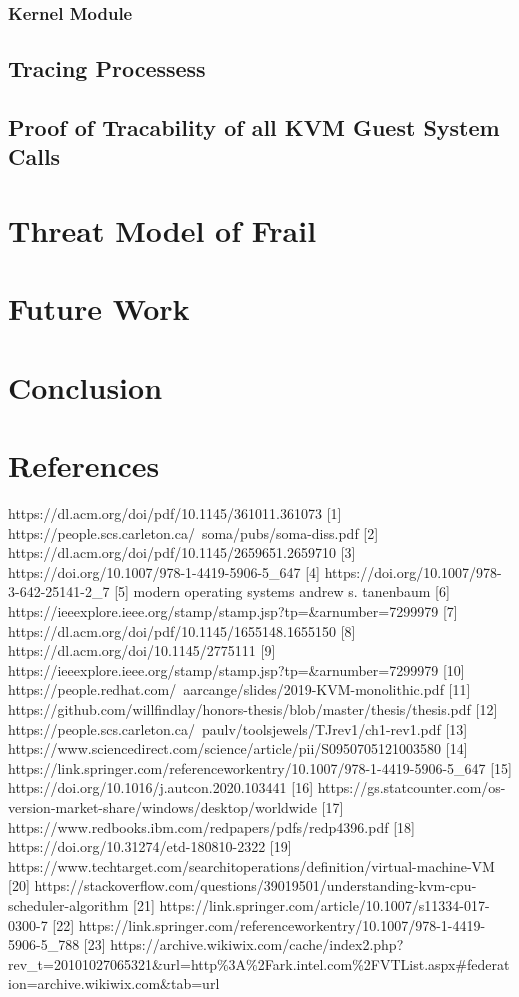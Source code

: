 \documentclass{report}
\begin{document}
\begin{spacing}{1.5}
\subsection{Kernel Module}
\section{Tracing Processess}
\section{Proof of Tracability of all KVM Guest System Calls}

\chapter{Threat Model of Frail}


\chapter{Future Work}

\chapter{Conclusion}

\chapter{References}

{\large
https://dl.acm.org/doi/pdf/10.1145/361011.361073 [1]
https://people.scs.carleton.ca/~soma/pubs/soma-diss.pdf [2]
https://dl.acm.org/doi/pdf/10.1145/2659651.2659710 [3]
https://doi.org/10.1007/978-1-4419-5906-5\_647 [4]
https://doi.org/10.1007/978-3-642-25141-2\_7 [5]
modern operating systems andrew s. tanenbaum [6]
https://ieeexplore.ieee.org/stamp/stamp.jsp?tp=\&arnumber=7299979 [7]
https://dl.acm.org/doi/pdf/10.1145/1655148.1655150 [8]
https://dl.acm.org/doi/10.1145/2775111 [9]
https://ieeexplore.ieee.org/stamp/stamp.jsp?tp=\&arnumber=7299979 [10]
https://people.redhat.com/~aarcange/slides/2019-KVM-monolithic.pdf [11]
https://github.com/willfindlay/honors-thesis/blob/master/thesis/thesis.pdf [12]
https://people.scs.carleton.ca/~paulv/toolsjewels/TJrev1/ch1-rev1.pdf [13]
https://www.sciencedirect.com/science/article/pii/S0950705121003580 [14]
https://link.springer.com/referenceworkentry/10.1007/978-1-4419-5906-5\_647 [15]
https://doi.org/10.1016/j.autcon.2020.103441 [16]
https://gs.statcounter.com/os-version-market-share/windows/desktop/worldwide [17]
https://www.redbooks.ibm.com/redpapers/pdfs/redp4396.pdf [18]
https://doi.org/10.31274/etd-180810-2322 [19]
https://www.techtarget.com/searchitoperations/definition/virtual-machine-VM [20]
https://stackoverflow.com/questions/39019501/understanding-kvm-cpu-scheduler-algorithm [21]
https://link.springer.com/article/10.1007/s11334-017-0300-7 [22]
https://link.springer.com/referenceworkentry/10.1007/978-1-4419-5906-5\_788 [23]
https://archive.wikiwix.com/cache/index2.php?rev\_t=20101027065321\&url=http\%3A\%2Fark.intel.com\%2FVTList.aspx\#federation=archive.wikiwix.com\&tab=url
}
\end{spacing}
\end{document}
